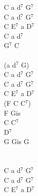 \documentclass[a5paper, 10pt]{book}
\begin{document}
\begin{minipage}[t]{0.3\textwidth}
C a d$^7$ G$^7$\\
C a d$^7$ G$^7$\\
C E$^7$ a D$^7$\\

C a d$^7$\\
G$^7$ C\\
\\
(a d$^7$ G)\\
C a d$^7$ G$^7$\\
C a d$^7$ G$^7$\\
C E$^7$ a D$^7$\\

(F C C$^7$)\\
F Gis\\
C C$^7$\\
D$^7$\\
G Gis G\\
\\
\\
C a d$^7$ G$^7$\\
C a d$^7$ G$^7$\\
C E$^7$ a D$^7$\\

\end{minipage}

\newpage
\end{document}
